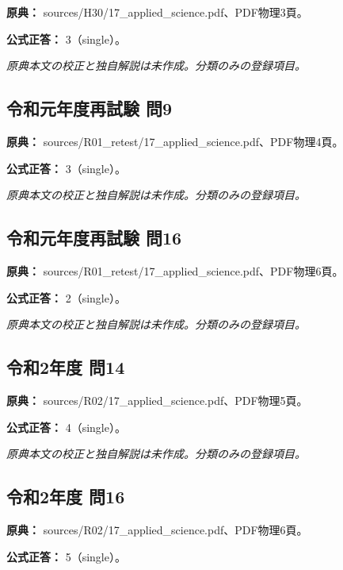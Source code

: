 \noindent\textbf{原典：} sources/H30/17\_applied\_science.pdf、PDF物理3頁。

\textbf{公式正答：} 3（single）。

\par\textit{原典本文の校正と独自解説は未作成。分類のみの登録項目。}

\subsection{令和元年度再試験 問9}
\label{q:r01-ret-applied-09}

\noindent\textbf{原典：} sources/R01\_retest/17\_applied\_science.pdf、PDF物理4頁。

\textbf{公式正答：} 3（single）。

\par\textit{原典本文の校正と独自解説は未作成。分類のみの登録項目。}

\subsection{令和元年度再試験 問16}
\label{q:r01-ret-applied-16}

\noindent\textbf{原典：} sources/R01\_retest/17\_applied\_science.pdf、PDF物理6頁。

\textbf{公式正答：} 2（single）。

\par\textit{原典本文の校正と独自解説は未作成。分類のみの登録項目。}

\subsection{令和2年度 問14}
\label{q:r02-reg-applied-14}

\noindent\textbf{原典：} sources/R02/17\_applied\_science.pdf、PDF物理5頁。

\textbf{公式正答：} 4（single）。

\par\textit{原典本文の校正と独自解説は未作成。分類のみの登録項目。}

\subsection{令和2年度 問16}
\label{q:r02-reg-applied-16}

\noindent\textbf{原典：} sources/R02/17\_applied\_science.pdf、PDF物理6頁。

\textbf{公式正答：} 5（single）。

